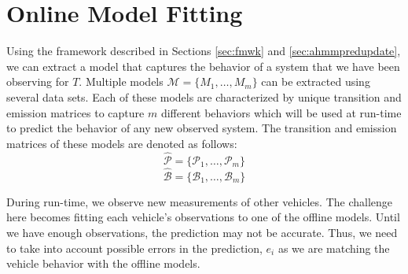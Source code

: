 \documentclass[letterpaper, 10 pt, conference]{ieeeconf}  %
\newcommand\NB[1]{$\spadesuit$\footnote{NB: #1}}
\newcommand\RP[1]{$\clubsuit$\footnote{RP: #1}}
\begin{document}
\section{Online Model Fitting}\label{sec:omf}
Using the framework described in Sections \ref{sec:fmwk} and \ref{sec:ahmmpredupdate}, we can extract a model that captures the behavior of a system that we have been observing for $T$. Multiple models $\mathcal{M} = \{M_1,\ldots,M_m\}$ can be extracted using several data sets. Each of these models are characterized by unique transition and emission matrices to capture $m$ different behaviors which will be used at run-time to predict the behavior of any new observed system.
The transition and emission matrices of these models are denoted as follows: %
\begin{equation}
    \hat{\mathcal{P}} = \{\mathcal{P}_1,\ldots,\mathcal{P}_m\}
\end{equation}
\begin{equation}
    \hat{\mathcal{B}} = \{\mathcal{B}_1,\ldots,\mathcal{B}_{m}\}
\end{equation}


During run-time, we observe new measurements of other vehicles. The challenge here becomes fitting each vehicle's observations to one of the offline models. Until we have enough observations, the prediction may not be accurate. Thus, we need to take into account possible errors in the prediction, $e_i$ as we are matching the vehicle behavior with the offline models. 

\end{document}
